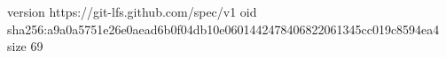 version https://git-lfs.github.com/spec/v1
oid sha256:a9a0a5751e26e0aead6b0f04db10e0601442478406822061345cc019c8594ea4
size 69
